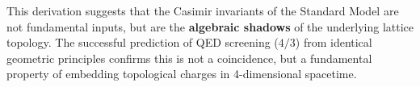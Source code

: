 This derivation suggests that the Casimir invariants of the Standard Model are not fundamental inputs, but are the \textbf{algebraic shadows} of the underlying lattice topology. The successful prediction of QED screening ($4/3$) from identical geometric principles confirms this is not a coincidence, but a fundamental property of embedding topological charges in 4-dimensional spacetime.